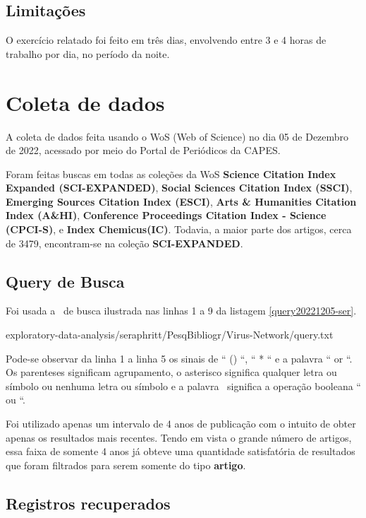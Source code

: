 \subsection{Limitações} O exercício relatado foi feito em três dias, envolvendo entre 3 e 4 horas de trabalho por dia, no período da noite.

\section{Coleta de dados\label{ESS@seraphritt:coleta}}

A coleta de dados feita usando o WoS (Web of Science) no dia 05 de Dezembro de 2022, acessado por meio do Portal de Periódicos da CAPES.

Foram feitas buscas em todas as coleções da WoS \textbf{Science  Citation  Index  Expanded (SCI-EXPANDED)}, \textbf{Social  Sciences  Citation  Index (SSCI)}, \textbf{Emerging Sources Citation Index (ESCI)}, \textbf{Arts \& Humanities Citation Index (A\&HI)}, \textbf{Conference Proceedings Citation Index - Science (CPCI-S)}, e \textbf{Index Chemicus(IC)}. Todavia, a maior parte dos artigos, cerca de 3479, encontram-se na coleção \textbf{SCI-EXPANDED}.

\subsection{Query de Busca}

Foi usada a \query\  de busca ilustrada nas linhas 1 a 9 da listagem \ref{query20221205-ser}.


{exploratory-data-analysis/seraphritt/PesqBibliogr/Virus-Network/query.txt}

Pode-se observar da linha 1 a linha 5 os sinais de `` () ``, `` * `` e a palavra `` or ``.  Os parenteses significam agrupamento, o asterisco significa qualquer letra ou símbolo ou nenhuma letra ou símbolo e a palavra \or\ significa a operação booleana `` ou ``.

Foi utilizado apenas um intervalo de 4 anos de publicação com o intuito de obter apenas os resultados mais recentes. Tendo em vista o grande número de artigos, essa faixa de somente 4 anos já obteve uma quantidade satisfatória de resultados que foram filtrados para serem somente do tipo \textbf{artigo}.

\subsection{Registros recuperados}

